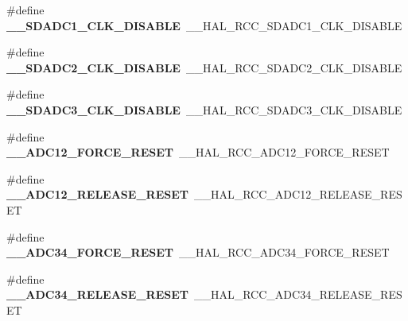 \begin{DoxyCompactItemize}
\item 
\mbox{\label{group___h_a_l___r_c_c___aliased_ga7bee6f236c8a299f3b751b46612348a5}} 
\#define {\bfseries \+\_\+\+\_\+\+S\+D\+A\+D\+C1\+\_\+\+C\+L\+K\+\_\+\+D\+I\+S\+A\+B\+LE}~\+\_\+\+\_\+\+H\+A\+L\+\_\+\+R\+C\+C\+\_\+\+S\+D\+A\+D\+C1\+\_\+\+C\+L\+K\+\_\+\+D\+I\+S\+A\+B\+LE
\item 
\mbox{\label{group___h_a_l___r_c_c___aliased_ga99088247c1f6d91fbc4423f589139445}} 
\#define {\bfseries \+\_\+\+\_\+\+S\+D\+A\+D\+C2\+\_\+\+C\+L\+K\+\_\+\+D\+I\+S\+A\+B\+LE}~\+\_\+\+\_\+\+H\+A\+L\+\_\+\+R\+C\+C\+\_\+\+S\+D\+A\+D\+C2\+\_\+\+C\+L\+K\+\_\+\+D\+I\+S\+A\+B\+LE
\item 
\mbox{\label{group___h_a_l___r_c_c___aliased_ga42ec4cf1c87cbddc3b2298baedddba7b}} 
\#define {\bfseries \+\_\+\+\_\+\+S\+D\+A\+D\+C3\+\_\+\+C\+L\+K\+\_\+\+D\+I\+S\+A\+B\+LE}~\+\_\+\+\_\+\+H\+A\+L\+\_\+\+R\+C\+C\+\_\+\+S\+D\+A\+D\+C3\+\_\+\+C\+L\+K\+\_\+\+D\+I\+S\+A\+B\+LE
\item 
\mbox{\label{group___h_a_l___r_c_c___aliased_gacbc2844f7655815ba4ae65f4ca715dbb}} 
\#define {\bfseries \+\_\+\+\_\+\+A\+D\+C12\+\_\+\+F\+O\+R\+C\+E\+\_\+\+R\+E\+S\+ET}~\+\_\+\+\_\+\+H\+A\+L\+\_\+\+R\+C\+C\+\_\+\+A\+D\+C12\+\_\+\+F\+O\+R\+C\+E\+\_\+\+R\+E\+S\+ET
\item 
\mbox{\label{group___h_a_l___r_c_c___aliased_gaccd3e06d5b914cebaaacbc94d05c7660}} 
\#define {\bfseries \+\_\+\+\_\+\+A\+D\+C12\+\_\+\+R\+E\+L\+E\+A\+S\+E\+\_\+\+R\+E\+S\+ET}~\+\_\+\+\_\+\+H\+A\+L\+\_\+\+R\+C\+C\+\_\+\+A\+D\+C12\+\_\+\+R\+E\+L\+E\+A\+S\+E\+\_\+\+R\+E\+S\+ET
\item 
\mbox{\label{group___h_a_l___r_c_c___aliased_ga9d32ad39aa9a52a93e5cc48977fac1a1}} 
\#define {\bfseries \+\_\+\+\_\+\+A\+D\+C34\+\_\+\+F\+O\+R\+C\+E\+\_\+\+R\+E\+S\+ET}~\+\_\+\+\_\+\+H\+A\+L\+\_\+\+R\+C\+C\+\_\+\+A\+D\+C34\+\_\+\+F\+O\+R\+C\+E\+\_\+\+R\+E\+S\+ET
\item 
\mbox{\label{group___h_a_l___r_c_c___aliased_gad758bcf779fd9cab005fcc8fc6bf23ae}} 
\#define {\bfseries \+\_\+\+\_\+\+A\+D\+C34\+\_\+\+R\+E\+L\+E\+A\+S\+E\+\_\+\+R\+E\+S\+ET}~\+\_\+\+\_\+\+H\+A\+L\+\_\+\+R\+C\+C\+\_\+\+A\+D\+C34\+\_\+\+R\+E\+L\+E\+A\+S\+E\+\_\+\+R\+E\+S\+ET

\end{DoxyCompactItemize}
